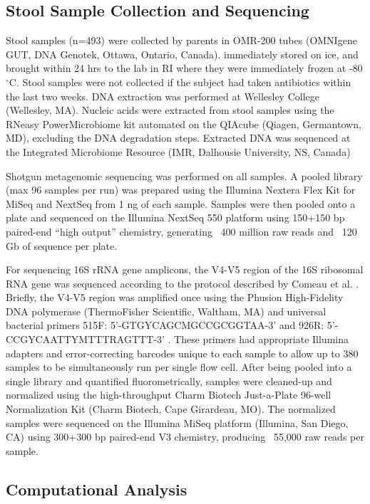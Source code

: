 \documentclass[fleqn,10pt]{wlscirep}
\begin{document}
\subsection*{Stool Sample Collection and Sequencing}

Stool samples (n=493) were collected by parents in OMR-200 tubes (OMNIgene GUT, DNA Genotek, Ottawa, Ontario, Canada).
immediately stored on ice, and brought within 24 hrs to the lab in RI where they were immediately frozen at -80$^{\circ}$C.
Stool samples were not collected if the subject had taken antibiotics within the last two weeks.
DNA extraction was performed at Wellesley College (Wellesley, MA).
Nucleic acids were extracted from stool samples using the RNeasy PowerMicrobiome kit
automated on the QIAcube (Qiagen, Germantown, MD), excluding the DNA degradation steps.
Extracted DNA was sequenced at the Integrated Microbiome Resource (IMR, Dalhousie University, NS, Canada)

Shotgun metagenomic sequencing was performed on all samples.
A pooled library (max 96 samples per run) was prepared using the Illumina Nextera Flex Kit for MiSeq and NextSeq from 1 ng of each sample.
Samples were then pooled onto a plate and sequenced
on the Illumina NextSeq 550 platform using 150+150 bp paired-end “high output” chemistry,
generating ~400 million raw reads and ~120 Gb of sequence per plate.

For sequencing 16S rRNA gene amplicons,
the V4-V5 region of the 16S ribosomal RNA gene was sequenced according to the protocol
described by Comeau et al. \cite{Comeau2017-jg}.
Briefly, the V4-V5 region was amplified once using the Phusion High-Fidelity DNA polymerase
(ThermoFisher Scientific, Waltham, MA) and universal bacterial primers
515F: 5’-GTGYCAGCMGCCGCGGTAA-3’ and 926R: 5’-CCGYCAATTYMTTTRAGTTT-3’ \cite{Parada2016-uz,Walters2016-fi}.
These primers had appropriate Illumina adapters and error-correcting barcodes unique to each sample
to allow up to 380 samples to be simultaneously run per single flow cell.
After being pooled into a single library and quantified fluorometrically,
samples were cleaned-up and normalized using the high-throughput Charm Biotech Just-a-Plate 96-well Normalization Kit (Charm Biotech, Cape Girardeau, MO).
The normalized samples were sequenced on the Illumina MiSeq platform (Illumina, San Diego, CA)
using 300+300 bp paired-end V3 chemistry, producing ~55,000 raw reads per sample.

\subsection*{Computational Analysis}
\end{document}

